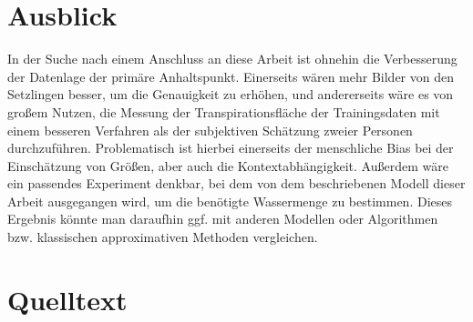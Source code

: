 \section{Ausblick}
In der Suche nach einem Anschluss an diese Arbeit ist ohnehin die Verbesserung der Datenlage der primäre Anhaltspunkt. Einerseits wären mehr Bilder von den Setzlingen besser, um die Genauigkeit zu erhöhen, und andererseits wäre es von großem Nutzen, die Messung der Transpirationsfläche der Trainingsdaten mit einem besseren Verfahren als der subjektiven Schätzung zweier Personen durchzuführen. Problematisch ist hierbei einerseits der menschliche Bias bei der Einschätzung von Größen, aber auch die Kontextabhängigkeit. Außerdem wäre ein passendes Experiment denkbar, bei dem von dem beschriebenen Modell dieser Arbeit ausgegangen wird, um die benötigte Wassermenge zu bestimmen. Dieses Ergebnis könnte man daraufhin ggf. mit anderen Modellen oder Algorithmen bzw. klassischen approximativen Methoden vergleichen.
\newpage
\section{Quelltext}
